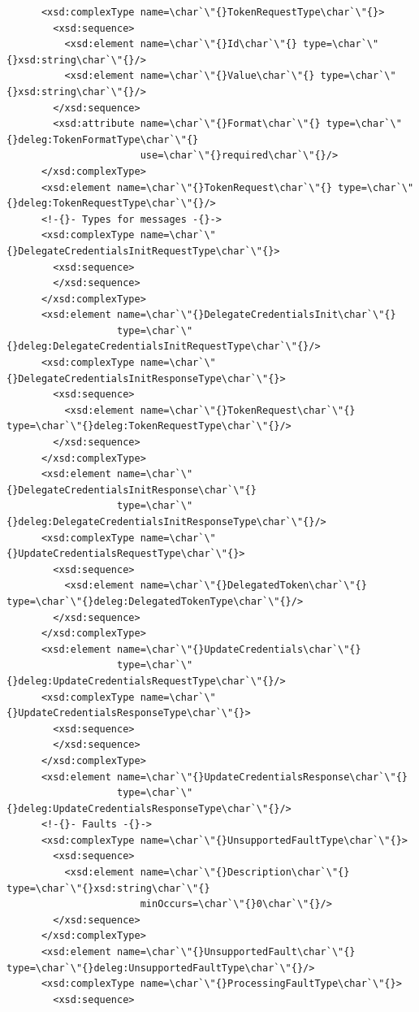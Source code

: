 \documentclass{article}                            %
\begin{document}
\begin{footnotesize}
\begin{verbatim}
      <xsd:complexType name=\char`\"{}TokenRequestType\char`\"{}>
        <xsd:sequence>
          <xsd:element name=\char`\"{}Id\char`\"{} type=\char`\"{}xsd:string\char`\"{}/>
          <xsd:element name=\char`\"{}Value\char`\"{} type=\char`\"{}xsd:string\char`\"{}/>
        </xsd:sequence>
        <xsd:attribute name=\char`\"{}Format\char`\"{} type=\char`\"{}deleg:TokenFormatType\char`\"{}
                       use=\char`\"{}required\char`\"{}/>
      </xsd:complexType>
      <xsd:element name=\char`\"{}TokenRequest\char`\"{} type=\char`\"{}deleg:TokenRequestType\char`\"{}/>
      <!-{}- Types for messages -{}->
      <xsd:complexType name=\char`\"{}DelegateCredentialsInitRequestType\char`\"{}>
        <xsd:sequence>
        </xsd:sequence>
      </xsd:complexType>
      <xsd:element name=\char`\"{}DelegateCredentialsInit\char`\"{}
                   type=\char`\"{}deleg:DelegateCredentialsInitRequestType\char`\"{}/>
      <xsd:complexType name=\char`\"{}DelegateCredentialsInitResponseType\char`\"{}>
        <xsd:sequence>
          <xsd:element name=\char`\"{}TokenRequest\char`\"{} type=\char`\"{}deleg:TokenRequestType\char`\"{}/>
        </xsd:sequence>
      </xsd:complexType>
      <xsd:element name=\char`\"{}DelegateCredentialsInitResponse\char`\"{}
                   type=\char`\"{}deleg:DelegateCredentialsInitResponseType\char`\"{}/>
      <xsd:complexType name=\char`\"{}UpdateCredentialsRequestType\char`\"{}>
        <xsd:sequence>
          <xsd:element name=\char`\"{}DelegatedToken\char`\"{} type=\char`\"{}deleg:DelegatedTokenType\char`\"{}/>
        </xsd:sequence>
      </xsd:complexType>
      <xsd:element name=\char`\"{}UpdateCredentials\char`\"{}
                   type=\char`\"{}deleg:UpdateCredentialsRequestType\char`\"{}/>
      <xsd:complexType name=\char`\"{}UpdateCredentialsResponseType\char`\"{}>
        <xsd:sequence>
        </xsd:sequence>
      </xsd:complexType>
      <xsd:element name=\char`\"{}UpdateCredentialsResponse\char`\"{}
                   type=\char`\"{}deleg:UpdateCredentialsResponseType\char`\"{}/>
      <!-{}- Faults -{}->
      <xsd:complexType name=\char`\"{}UnsupportedFaultType\char`\"{}>
        <xsd:sequence>
          <xsd:element name=\char`\"{}Description\char`\"{} type=\char`\"{}xsd:string\char`\"{}
                       minOccurs=\char`\"{}0\char`\"{}/>
        </xsd:sequence>
      </xsd:complexType>
      <xsd:element name=\char`\"{}UnsupportedFault\char`\"{} type=\char`\"{}deleg:UnsupportedFaultType\char`\"{}/>
      <xsd:complexType name=\char`\"{}ProcessingFaultType\char`\"{}>
        <xsd:sequence>

\end{verbatim}
\end{footnotesize}
\end{document}
